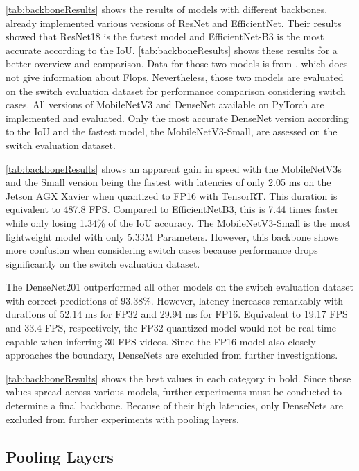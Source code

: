 \clearpage

\noindent\autoref{tab:backboneResults} shows the results of models with different backbones.
\cite{tepNet2024} already implemented various versions of ResNet and EfficientNet.
Their results showed that ResNet18 is the fastest model and EfficientNet-B3 is the most accurate according to the \ac{IoU}.
\autoref{tab:backboneResults} shows these results for a better overview and comparison.
Data for those two models is from \cite{tepNet2024}, which does not give information about Flops.
Nevertheless, those two models are evaluated on the switch evaluation dataset for performance comparison considering switch cases.
All versions of MobileNetV3 and DenseNet available on PyTorch are implemented and evaluated.
Only the most accurate DenseNet version according to the \ac{IoU} and the fastest model, the MobileNetV3-Small, are assessed on the switch evaluation dataset.

\autoref{tab:backboneResults} shows an apparent gain in speed with the MobileNetV3s and the Small version being the fastest with latencies of only 2.05 ms on the Jetson AGX Xavier when quantized to FP16 with TensorRT.
This duration is equivalent to 487.8 \ac{FPS}.
Compared to EfficientNetB3, this is 7.44 times faster while only losing 1.34\% of the \ac{IoU} accuracy.
The MobileNetV3-Small is the most lightweight model with only 5.33M Parameters.
However, this backbone shows more confusion when considering switch cases because performance drops significantly on the switch evaluation dataset.

The DenseNet201 outperformed all other models on the switch evaluation dataset with correct predictions of 93.38\%.
However, latency increases remarkably with durations of 52.14 ms for FP32 and 29.94 ms for FP16.
Equivalent to 19.17 \ac{FPS} and 33.4 \ac{FPS}, respectively, the FP32 quantized model would not be real-time capable when inferring 30 \ac{FPS} videos.
Since the FP16 model also closely approaches the boundary, DenseNets are excluded from further investigations.

\autoref{tab:backboneResults} shows the best values in each category in bold.
Since these values spread across various models, further experiments must be conducted to determine a final backbone.
Because of their high latencies, only DenseNets are excluded from further experiments with pooling layers.

\subsection{Pooling Layers}


